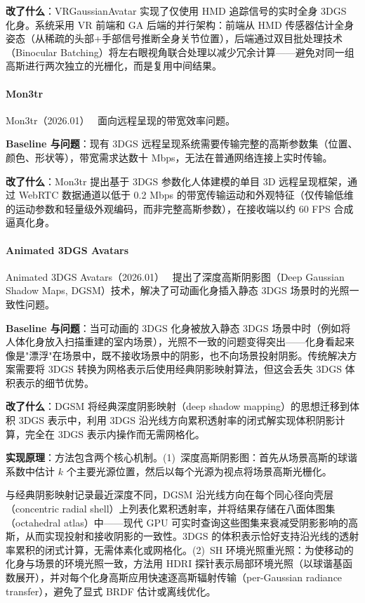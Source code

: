 \textbf{改了什么}：VRGaussianAvatar 实现了仅使用 HMD 追踪信号的实时全身 3DGS 化身。系统采用 VR 前端和 GA 后端的并行架构：前端从 HMD 传感器估计全身姿态（从稀疏的头部+手部信号推断全身关节位置），后端通过双目批处理技术（Binocular Batching）将左右眼视角联合处理以减少冗余计算——避免对同一组高斯进行两次独立的光栅化，而是复用中间结果。

\paragraph{Mon3tr}

Mon3tr（2026.01）~\cite{2601_07518} 面向远程呈现的带宽效率问题。

\textbf{Baseline 与问题}：现有 3DGS 远程呈现系统需要传输完整的高斯参数集（位置、颜色、形状等），带宽需求达数十 Mbps，无法在普通网络连接上实时传输。

\textbf{改了什么}：Mon3tr 提出基于 3DGS 参数化人体建模的单目 3D 远程呈现框架，通过 WebRTC 数据通道以低于 0.2 Mbps 的带宽传输运动和外观特征（仅传输低维的运动参数和轻量级外观编码，而非完整高斯参数），在接收端以约 60 FPS 合成逼真化身。

\paragraph{Animated 3DGS Avatars}

Animated 3DGS Avatars（2026.01）~\cite{2601_01660} 提出了深度高斯阴影图（Deep Gaussian Shadow Maps, DGSM）技术，解决了可动画化身插入静态 3DGS 场景时的光照一致性问题。

\textbf{Baseline 与问题}：当可动画的 3DGS 化身被放入静态 3DGS 场景中时（例如将人体化身放入扫描重建的室内场景），光照不一致的问题变得突出——化身看起来像是"漂浮"在场景中，既不接收场景中的阴影，也不向场景投射阴影。传统解决方案需要将 3DGS 转换为网格表示后使用经典阴影映射算法，但这会丢失 3DGS 体积表示的细节优势。

\textbf{改了什么}：DGSM 将经典深度阴影映射（deep shadow mapping）的思想迁移到体积 3DGS 表示中，利用 3DGS 沿光线方向累积透射率的闭式解实现体积阴影计算，完全在 3DGS 表示内操作而无需网格化。

\textbf{实现原理}：方法包含两个核心机制。(1)~深度高斯阴影图：首先从场景高斯的球谐系数中估计 $k$ 个主要光源位置，然后以每个光源为视点将场景高斯光栅化。

与经典阴影映射记录最近深度不同，DGSM 沿光线方向在每个同心径向壳层（concentric radial shell）上列表化累积透射率，并将结果存储在八面体图集（octahedral atlas）中——现代 GPU 可实时查询这些图集来衰减受阴影影响的高斯，从而实现投射和接收阴影的一致性。3DGS 的体积表示恰好支持沿光线的透射率累积的闭式计算，无需体素化或网格化。(2)~SH 环境光照重光照：为使移动的化身与场景的环境光照一致，方法用 HDRI 探针表示局部环境光照（以球谐基函数展开），并对每个化身高斯应用快速逐高斯辐射传输（per-Gaussian radiance transfer），避免了显式 BRDF 估计或离线优化。

